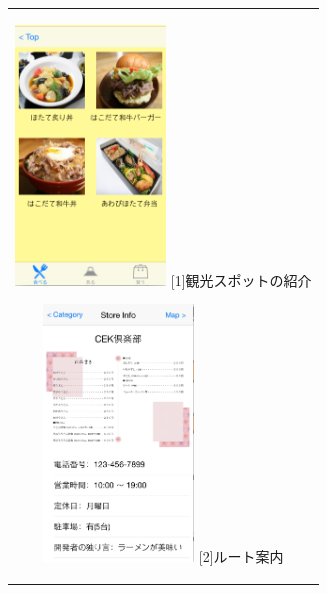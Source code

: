 \documentclass[openany,11pt,papersize]{jsbook}
\begin{document}
\begin{figure}[htbp]
  \begin{center}
    \begin{tabular}{c}

      \begin{minipage}{0.33\hsize}
        \begin{center}
\includegraphics[width=4cm, bb=0 0 320 552]{5.4_category.png}
          \hspace{1cm} [1]観光スポットの紹介
        \end{center}
      \end{minipage}

      \begin{minipage}{0.33\hsize}
        \begin{center}
\includegraphics[width=4cm, bb=0 0 321 547]{5.4_detail.png}
          \hspace{1cm} [2]ルート案内
        \end{center}
      \end{minipage}


\end{tabular}
\end{center}
\end{figure}
\end{document}
